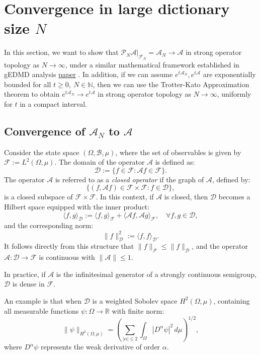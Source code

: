 \documentclass{article}[11]
\begin{document}
	
	\newpage
	\section{Convergence in large dictionary size $N$}
	In this section, we want to show that $\mathcal{P}_N\mathcal{A}|_{\mathcal{F}_N} = \mathcal{A}_N \to \mathcal{A}$ in strong operator topology as $N \to \infty$, under a similar mathematical framework established in gEDMD analysis \href{https://arxiv.org/abs/2405.00539}{paper} . In addition, if we can assume $e^{t\mathcal{A}_N}, e^{t\mathcal{A}}$ are exponentially bounded for all $t\geq 0, \ N\in\mathbb{N}$, then we can use the Trotter-Kato Approximation theorem to obtain $e^{t\mathcal{A}_N} \to e^{t\mathcal{A}}$ in strong operator topology as $N \to \infty$, uniformly for $t$ in a compact interval.
	
	
	\subsection{Convergence of \(\mathcal{A}_N\) to \(\mathcal{A}\)}
	
	Consider the state space \( (\Omega, \mathcal{B}, \mu) \), where the set of observables is given by \( \mathcal{F} := L^2(\Omega, \mu) \). The domain of the operator \( \mathcal{A} \) is defined as:
	\[
	\mathcal{D} := \{ f \in \mathcal{F} : \mathcal{A} f \in \mathcal{F} \}.
	\]
	The operator \( \mathcal{A} \) is referred to as a \textit{closed operator} if the graph of \( \mathcal{A} \), defined by:
	\[
	\{ (f, \mathcal{A} f) \in \mathcal{F} \times \mathcal{F} : f \in \mathcal{D} \},
	\]
	is a closed subspace of \( \mathcal{F} \times \mathcal{F} \). In this context, if \( \mathcal{A} \) is closed, then \( \mathcal{D} \) becomes a Hilbert space equipped with the inner product:
	\[
	\langle f, g \rangle_\mathcal{D} := \langle f, g \rangle_{\mathcal{F}} + \langle \mathcal{A} f, \mathcal{A} g \rangle_{\mathcal{F}}, \quad \forall f, g \in \mathcal{D},
	\]
	and the corresponding norm:
	\[
	\| f \|_\mathcal{D}^2 := \langle f, f \rangle_\mathcal{D}.
	\]
	It follows directly from this structure that \( \| f \|_{\mathcal{F}} \leq \| f \|_\mathcal{D} \), and the operator \( \mathcal{A} : \mathcal{D} \to \mathcal{F} \) is continuous with \( \| \mathcal{A} \| \leq 1 \).
	
	In practice, if \( \mathcal{A} \) is the infinitesimal generator of a strongly continuous semigroup, \( \mathcal{D} \) is dense in \( \mathcal{F} \).
	
	An example is that when \( \mathcal{D} \) is a weighted Sobolev space \( H^2(\Omega, \mu) \), containing all measurable functions \( \psi: \Omega \to \mathbb{R} \) with finite norm:
	\[
	\| \psi \|_{H^2(\Omega, \mu)} = \left( \sum_{|\alpha| \leq 2} \int_\Omega |D^\alpha \psi|^2 \, d\mu \right)^{1/2},
	\]
	where \( D^\alpha \psi \) represents the weak derivative of order \( \alpha \). 
	
\end{document}
